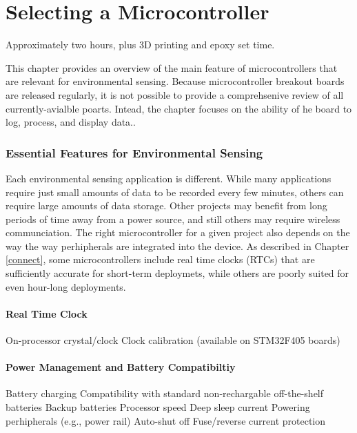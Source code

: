 %
  \setchapterpreamble[u]{\margintoc}
  \chapter{Selecting a Microcontroller}

  \begin{kaobox}[backgroundcolor=\SNcolor,frametitlebackgroundcolor=\SNcolor,frametitle=Estimated build time] Approximately two hours, plus 3D printing and epoxy set time.
  \end{kaobox}

  This chapter provides an overview of the main feature of microcontrollers that are relevant for environmental sensing.
  Because microcontroller breakout boards are released regularly, it is not possible to provide a comprehsenive review of all currently-avialble poarts.  Intead, the chapter focuses on the ability of he board to log, process, and display data..


  \subsection{Essential Features for Environmental Sensing}
  Each environmental sensing application is different. While many applications require just small amounts of data to be recorded every few minutes, others can require large amounts of data storage. Other projects may benefit from long periods of time away from a power source, and still others may require wireless communciation. The right microcontroller for a given project also depends on the way the way perhipherals are integrated into the device.  As described in Chapter \ref{connect}, some microcontrollers include real time clocks (RTCs) that are sufficiently accurate for short-term deploymets, while others are poorly suited for even hour-long deployments.

  \subsubsection{Real Time Clock}
  On-processor crystal/clock
  Clock calibration (available on STM32F405 boards)

  \subsubsection{Power Management and Battery Compatibiltiy}
  Battery charging
  Compatibility with standard non-rechargable off-the-shelf batteries
  Backup batteries
  Processor speed
  Deep sleep current
  Powering perhipherals (e.g., power rail)
  Auto-shut off
  Fuse/reverse current protection

